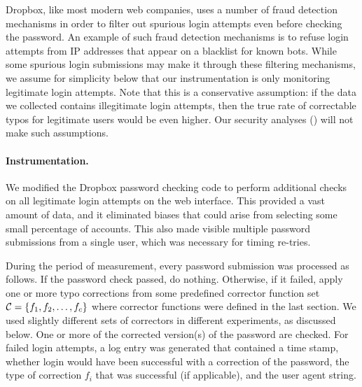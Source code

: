 Dropbox, like most modern web companies, uses a number of fraud detection
mechanisms in order to filter out spurious login attempts even before checking
the password. An example of such fraud detection mechanisms is to refuse login
attempts from IP addresses that appear on a blacklist for known bots. While
some spurious login submissions may make it through these filtering mechanisms,
we assume for simplicity below that our instrumentation is only monitoring
legitimate login attempts. Note that this is a conservative assumption: if the
data we collected contains illegitimate login attempts, then the true rate of
correctable typos for legitimate users would be even higher. Our security analyses
() will not make such assumptions.


\iffalse
lowercase first character, uppercase first character, remove first character, remove last character, swap case of entire password
\fi




\paragraph{Instrumentation.} We modified the Dropbox password checking code to
perform additional checks on all legitimate login attempts on the web
interface. This provided a vast amount of data, and it eliminated biases that
could arise from selecting some small percentage of accounts. This also made visible multiple password submissions from a single user, which was necessary for timing
re-tries.

During the period of measurement, every password submission was
processed as follows. If the password check passed, do nothing.
Otherwise, if it failed, apply one or more typo corrections from some
predefined corrector function set ${\mathcal C} = \{f_1,f_2,\ldots,f_c\}$
where corrector functions were defined in the last section. We used
slightly different sets of correctors in different experiments, as
discussed below.  One or more of the corrected version(s) of the
password are checked. For failed login attempts, a log entry was
generated that contained a time stamp, whether login would have been
successful with a correction of the password, the type of correction $f_i$
that was successful (if applicable), and the user agent string.

